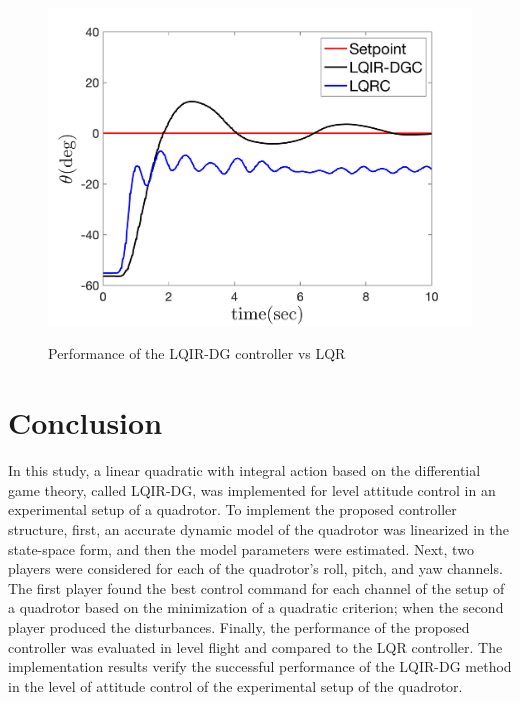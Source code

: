\documentclass[conference]{IEEEtran}
\begin{document}
\begin{figure}[!h]
	\centering
	{\includegraphics[width=\linewidth]{../Figures/Calibration/LQIDGvsLQR/Pitch/lqidgvslqr_pitch.png}
	}
	\caption{Performance of the LQIR-DG controller vs LQR}
\end{figure}


\section{Conclusion}
In this study, a linear quadratic with integral action based on the differential game theory, called LQIR-DG, was implemented for level attitude control in an experimental setup of a quadrotor. To implement the proposed controller structure, first, an accurate dynamic model of the quadrotor was linearized in the state-space form, and then the model parameters were estimated. Next, two players were considered for each of the quadrotor's roll, pitch, and yaw channels. The first player found the best control command for each channel of the setup of a quadrotor based on the minimization of a quadratic criterion; when the second player produced the disturbances. Finally, the performance of the proposed controller was evaluated in level flight and compared to the LQR controller. The implementation results verify the successful performance of the LQIR-DG method in the level of attitude control of the experimental setup of the quadrotor.






\end{document}
